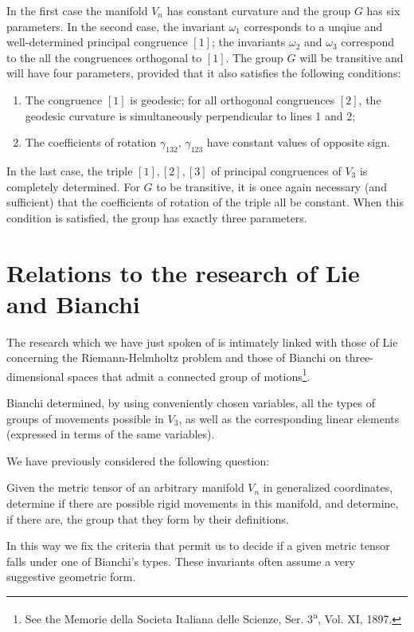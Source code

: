 \documentclass{book}
\begin{document}
In the first case the manifold $V_n$ has constant curvature and the group $G$ has six parameters. In the second case, the invariant $\omega_1$ corresponds to a unqiue and well-determined principal congruence $[1]$; the invariants $\omega_2$ and $\omega_3$ correspond to the all the congruences orthogonal to $[1]$. The group $G$ will be transitive and will have four parameters, provided that it also satisfies the following conditions:
\begin{enumerate}
	\item The congruence $[1]$ is geodesic; for all orthogonal congruences $[2]$, the geodesic curvature is simultaneously perpendicular to lines 1 and 2;
	\item The coefficients of rotation $\gamma_{132}$, $\gamma_{123}$ have constant values of opposite sign. 
\end{enumerate}

In the last case, the triple $[1],[2],[3]$ of principal congruences of $V_3$ is completely determined. For $G$ to be transitive, it is once again necessary (and sufficient) that the coefficients of rotation of the triple all be constant. When this condition is satisfied, the group has exactly three parameters.

\section{Relations to the research of Lie and Bianchi}

The research which we have just spoken of is intimately linked with those of Lie concerning the Riemann-Helmholtz problem and those of Bianchi on three-dimensional spaces that admit a connected group of motions\footnote{See the Memorie della Societa Italiana delle Scienze, Ser. 3\textsuperscript{a}, Vol. XI, 1897.}. 

Bianchi determined, by using conveniently chosen variables, all the types of groups of movements possible in $V_3$, as well as the corresponding linear elements (expressed in terms of the same variables). 

We have previously considered the following question: 

Given the metric tensor of an arbitrary manifold $V_n$ in generalized coordinates, determine if there are possible rigid movements in this manifold, and determine, if there are, the group that they form by their definitions. 

In this way we fix the criteria that permit us to decide if a given metric tensor falls under one of Bianchi's types. These invariants often assume a very suggestive geometric form.
\end{document}
